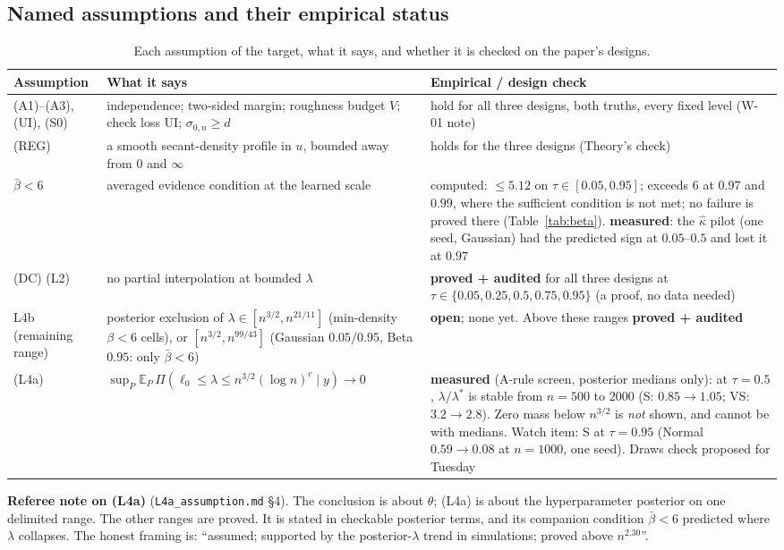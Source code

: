 \documentclass[11pt]{article}
\newcommand{\E}{\mathbb{E}}
\newcommand{\szero}{\sigma_{0,n}}
\newcommand{\supP}{\sup_{P}\E_P\,}
\newcommand{\PA}{\textcolor{proved}{\textbf{proved + audited}}}
\newcommand{\OP}{\textcolor{open}{\textbf{open}}}
\newcommand{\ME}{\textbf{measured}}
\theoremstyle{plain}
\begin{document}
\subsection{Named assumptions and their empirical status}

\begin{table}[h]
\centering\small
\caption{Each assumption of the target, what it says, and whether it is checked on the paper's designs.}
\label{tab:assump}
\setlength{\tabcolsep}{3pt}
\begin{tabular}{@{}p{2.2cm}p{5.6cm}p{6.6cm}@{}}
\toprule
Assumption & What it says & Empirical / design check \\
\midrule
(A1)--(A3), (UI), (S0) & independence; two-sided margin; roughness budget $V$; check loss UI; $\szero\ge d$ & hold for all three designs, both truths, every fixed level (W-01 note) \\[2pt]
(REG) & a smooth secant-density profile in $u$, bounded away from 0 and $\infty$ & holds for the three designs (Theory's check) \\[2pt]
$\bar\beta<6$ & averaged evidence condition at the learned scale & computed: $\le5.12$ on $\tau\in[0.05,0.95]$; exceeds $6$ at $0.97$ and $0.99$, where the sufficient condition is not met; no failure is proved there (Table~\ref{tab:beta}). \ME: the $\hat\kappa$ pilot (one seed, Gaussian) had the predicted sign at $0.05$--$0.5$ and lost it at $0.97$ \\[2pt]
(DC) (L2) & no partial interpolation at bounded $\lambda$ & \PA{} for all three designs at $\tau\in\{0.05,0.25,0.5,0.75,0.95\}$ (a proof, no data needed) \\[2pt]
L4b (remaining range) & posterior exclusion of $\lambda\in[n^{3/2},n^{21/11}]$ (min-density $\beta<6$ cells), or $[n^{3/2},n^{99/43}]$ (Gaussian $0.05/0.95$, Beta $0.95$: only $\bar\beta<6$) & \OP; none yet. Above these ranges \PA \\[2pt]
(L4a) & $\supP\Pi(\ell_0\le\lambda\le n^{3/2}(\log n)^c\mid y)\to0$ & \ME{} (A-rule screen, posterior medians only): at $\tau=0.5$, $\lambda/\lambda^*$ is stable from $n=500$ to $2000$ (S: $0.85\to1.05$; VS: $3.2\to2.8$). Zero mass below $n^{3/2}$ is \emph{not} shown, and cannot be with medians. Watch item: S at $\tau=0.95$ (Normal $0.59\to0.08$ at $n=1000$, one seed). Draws check proposed for Tuesday \\
\bottomrule
\end{tabular}
\end{table}

\noindent\textbf{Referee note on (L4a)} (\texttt{L4a\_assumption.md} \S4). The conclusion is about $\theta$; (L4a) is about the hyperparameter posterior on one delimited range. The other ranges are proved. It is stated in checkable posterior terms, and its companion condition $\bar\beta<6$ predicted where $\lambda$ collapses. The honest framing is: ``assumed; supported by the posterior-$\lambda$ trend in simulations; proved above $n^{2.30}$''.
\end{document}
